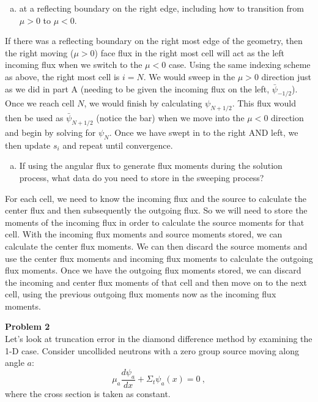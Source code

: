 \documentclass[10pt]{article}
\begin{document}
\vspace{10pt}
\begin{enumerate}[(c)]
\item at a reflecting boundary on the right edge, including how to transition from $\mu > 0$ to $\mu < 0$.
\end{enumerate}

If there was a reflecting boundary on the right most edge of the geometry, then the right moving ($\mu>0$) face flux in the right most cell will act as the left incoming flux when we switch to the $\mu < 0$ case. Using the same indexing scheme as above, the right most cell is $i=N$. We would sweep in the $\mu >0$ direction just as we did in part A (needing to be given the incoming flux on the left, $\bar{\psi}_{-1/2}$). Once we reach cell $N$, we would finish by calculating $\psi_{N+1/2}$. This flux would then be used as $\bar{\psi}_{N+1/2}$ (notice the bar) when we move into the $\mu<0$ direction and begin by solving for $\psi_N$. Once we have swept in to the right AND left, we then update $s_i$ and repeat until convergence.




\vspace{10pt}
\begin{enumerate}[(d)]
\item If using the angular flux to generate flux moments during the solution process, what data do you need to store in the sweeping process?
\end{enumerate}

For each cell, we need to know the incoming flux and the source to calculate the center flux and then subsequently the outgoing flux. So we will need to store the moments of the incoming flux in order to calculate the source moments for that cell. With the incoming flux moments and source moments stored, we can calculate the center flux moments. We can then discard the source moments and use the center flux moments and incoming flux moments to calculate the outgoing flux moments. Once we have the outgoing flux moments stored, we can discard the incoming and center flux moments of that cell and then move on to the next cell, using the previous outgoing flux moments now as the incoming flux moments.




\newpage
\noindent \textbf{Problem 2}\\
Let's look at truncation error in the diamond difference method by examining the 1-D case. Consider uncollided neutrons with a zero group source moving along angle $a$:
%
\begin{equation*}
\mu_a \frac{d \psi_a}{dx} + \Sigma_t \psi_a(x) = 0\:,
\end{equation*}
where the cross section is taken as constant.
\end{document}
